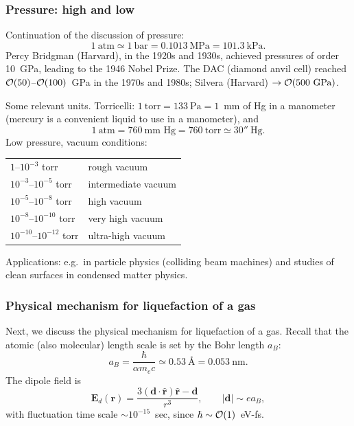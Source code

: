 \subsubsection*{Pressure: high and low}

Continuation of the discussion of pressure:
\begin{equation}
  1\ \text{atm} \simeq 1\ \text{bar} = 0.1013\ \text{MPa} = 101.3\ \text{kPa}.
\end{equation}
Percy Bridgman (Harvard), in the 1920s and 1930s, achieved pressures of order
10~GPa, leading to the 1946 Nobel Prize. The DAC (diamond anvil cell) reached
$\mathcal{O}(50)$--$\mathcal{O}(100)$~GPa in the 1970s and 1980s; Silvera (Harvard)
$\to\Order(500\ \text{GPa})$.

Some relevant units. Torricelli: $1\ \text{torr} = 133\ \text{Pa} = 1$~mm of Hg in a
manometer (mercury is a convenient liquid to use in a manometer), and
\begin{equation}
  1\ \text{atm} = 760\ \text{mm Hg} = 760\ \text{torr} \simeq 30''\ \text{Hg}.
\end{equation}
Low pressure, vacuum conditions:
\begin{center}
\begin{tabular}{ll}
  $1$--$10^{-3}$ torr & rough vacuum\\
  $10^{-3}$--$10^{-5}$ torr & intermediate vacuum\\
  $10^{-5}$--$10^{-8}$ torr & high vacuum\\
  $10^{-8}$--$10^{-10}$ torr & very high vacuum\\
  $10^{-10}$--$10^{-12}$ torr & ultra-high vacuum
\end{tabular}
\end{center}
Applications: e.g.\ in particle physics (colliding beam machines) and studies of clean
surfaces in condensed matter physics.

\subsubsection*{Physical mechanism for liquefaction of a gas}

Next, we discuss the physical mechanism for liquefaction of a gas. Recall that the
atomic (also molecular) length scale is set by the Bohr length $a_B$:
\begin{equation}
  a_B = \frac{\hbar}{\alpha m_e c}\simeq 0.53\ \text{\AA} = 0.053\ \text{nm}.
\end{equation}
The dipole field is
\begin{equation}
  \mathbf{E}_d(\mathbf{r}) = \frac{3(\mathbf{d}\cdot\hat{\mathbf{r}})\hat{\mathbf{r}}-\mathbf{d}}{r^3},
  \qquad |\mathbf{d}|\sim e a_B,
\end{equation}
with fluctuation time scale $\sim 10^{-15}$~sec, since $\hbar\sim\mathcal{O}(1)$~eV-fs.

